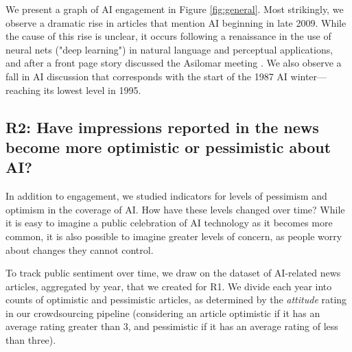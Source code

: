 \documentclass[letterpaper]{article}
\begin{document}
We present a graph of AI engagement in Figure \ref{fig:general}. Most strikingly, we observe a dramatic rise in articles that mention AI beginning in late 2009.  While the cause of this rise is unclear, it occurs following a renaissance in the use of neural nets ("deep learning") in natural language and perceptual applications, and after a front page story discussed the Asilomar meeting \cite{asilomar}. We also observe a fall in AI discussion that corresponds with the start of the 1987 AI winter---reaching its lowest level in 1995. %

\subsection{R2: Have impressions reported in the news become more optimistic or pessimistic about AI?}

In addition to engagement, we studied indicators for levels of pessimism and optimism in the coverage of AI. How have these levels changed over time? While it is easy to imagine a public celebration of AI technology as it becomes more common, it is also possible to imagine greater levels of concern, as people worry about changes they cannot control.

To track public sentiment over time, we draw on the dataset of AI-related news articles, aggregated by year, that we created for R1. We divide each year into counts of optimistic and pessimistic articles, as determined by the \textit{attitude} rating in our crowdsourcing pipeline (considering an article optimistic if it has an average rating greater than 3, and pessimistic if it has an average rating of less than three). %
\end{document}
